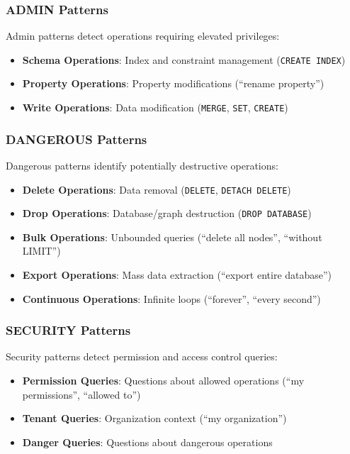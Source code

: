 \subsubsection{ADMIN Patterns}

Admin patterns detect operations requiring elevated privileges:

\begin{itemize}
    \item \textbf{Schema Operations}: Index and constraint management (\texttt{CREATE INDEX})
    \item \textbf{Property Operations}: Property modifications (``rename property'')
    \item \textbf{Write Operations}: Data modification (\texttt{MERGE}, \texttt{SET}, \texttt{CREATE})
\end{itemize}

\subsubsection{DANGEROUS Patterns}

Dangerous patterns identify potentially destructive operations:

\begin{itemize}
    \item \textbf{Delete Operations}: Data removal (\texttt{DELETE}, \texttt{DETACH DELETE})
    \item \textbf{Drop Operations}: Database/graph destruction (\texttt{DROP DATABASE})
    \item \textbf{Bulk Operations}: Unbounded queries (``delete all nodes'', ``without LIMIT'')
    \item \textbf{Export Operations}: Mass data extraction (``export entire database'')
    \item \textbf{Continuous Operations}: Infinite loops (``forever'', ``every second'')
\end{itemize}

\subsubsection{SECURITY Patterns}

Security patterns detect permission and access control queries:

\begin{itemize}
    \item \textbf{Permission Queries}: Questions about allowed operations (``my permissions'', ``allowed to'')
    \item \textbf{Tenant Queries}: Organization context (``my organization'')
    \item \textbf{Danger Queries}: Questions about dangerous operations
\end{itemize}

